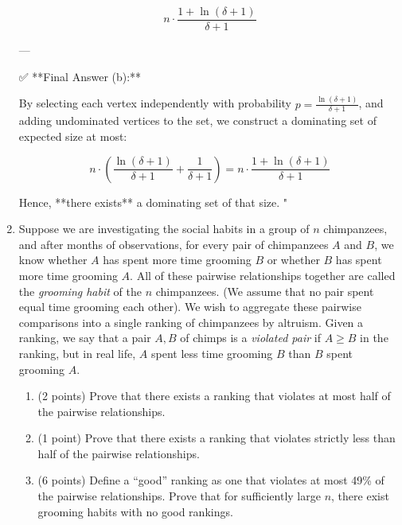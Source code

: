 \begin{enumerate}
\begin{shaded}
\[
\boxed{n \cdot \frac{1 + \ln(\delta + 1)}{\delta + 1}}
\]

---

✅ **Final Answer (b):**

By selecting each vertex independently with probability \( p = \frac{\ln(\delta + 1)}{\delta + 1} \), and adding undominated vertices to the set, we construct a dominating set of expected size at most:

\[
n \cdot \left( \frac{\ln(\delta + 1)}{\delta + 1} + \frac{1}{\delta + 1} \right) = n \cdot \frac{1 + \ln(\delta + 1)}{\delta + 1}
\]

Hence, **there exists** a dominating set of that size.
"

\fi
\end{shaded}
\fi


\item {} Suppose we are investigating the social habits in a group of $n$ chimpanzees, and after months of observations, for every pair of chimpanzees $A$ and $B$, we know whether $A$ has spent more time grooming $B$ or whether $B$ has spent more time grooming $A$.  All of these pairwise relationships together are called the \emph{grooming habit} of the $n$ chimpanzees.  (We assume that no pair spent equal time grooming each other). We wish to aggregate these pairwise comparisons into a single ranking of chimpanzees by altruism.  Given a ranking, we say that a pair $A,B$ of chimps is a \emph{violated pair} if $A \geq B$ in the ranking, but in real life, $A$ spent less time grooming $B$ than $B$ spent grooming $A$.

\begin{enumerate}
\item (2 points) Prove that there exists a ranking that violates at most half of the pairwise relationships.  

\item (1 point) Prove that there exists a ranking that violates strictly less than half of the pairwise relationships.

\item (6 points) Define a ``good'' ranking as one that violates at most 49\% of the pairwise relationships. Prove that for sufficiently large $n$, there exist grooming habits with no good rankings.



\end{enumerate}
\end{enumerate}
